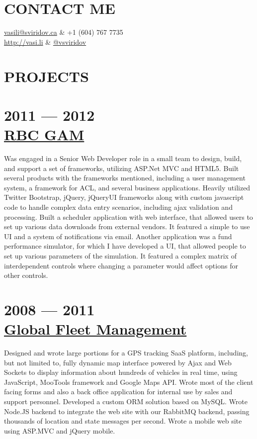 \documentclass[margin]{res}
\begin{document}
  
\address{ \#304 - 6742 Station Hill Ct \\ Burnaby, BC, V3N4V2\\Canada }
\begin{resume}

\section{CONTACT ME}
	\begin{ncolumn}{2}
		\href{mailto:vasili@sviridov.ca}{vasili@sviridov.ca} & +1 (604) 767 7735 \\
		\href{http://vasi.li}{http://vasi.li} & \href{http://twitter.com/vsviridov}{@vsviridov}
	\end{ncolumn}
 
\section{PROJECTS}
	\section{2011 --- 2012\\\href{http://www.rbcgam.com/gam/}{RBC GAM}}
	Was engaged in a Senior Web Developer role in a small team to design, build, and support a set of frameworks, utilizing ASP.Net MVC and HTML5. Built several products with the frameworks mentioned, including a user management system, a framework for ACL, and several business applications. Heavily utilized Twitter Bootstrap, jQuery, jQueryUI frameworks along with custom javascript code to handle complex data entry scenarios, including ajax validation and processing. Built a scheduler application with web interface, that allowed users to set up various data downloads from external vendors. It featured a simple to use UI and a system of notifications via email. Another application was a fund performance simulator, for which I have developed a UI, that allowed people to set up various parameters of the simulation. It featured a complex matrix of interdependent controls where changing a parameter would affect options for other controls.

	\section{2008 --- 2011\\\href{http://positrace.com}{Global Fleet Management}}
	 Designed and wrote large portions for a GPS tracking SaaS platform, including, but not limited to, fully dynamic map interface powered by Ajax and Web Sockets to display information about hundreds of vehicles in real time, using JavaScript, MooTools framework and Google Maps API. Wrote most of the client facing forms and also a back office application for internal use by sales and support personnel. Developed a custom ORM solution based on MySQL. Wrote Node.JS backend to integrate the web site with our RabbitMQ backend, passing thousands of location and state messages per second. Wrote a mobile web site using ASP.MVC and jQuery mobile.


\end{resume}
\end{document}

